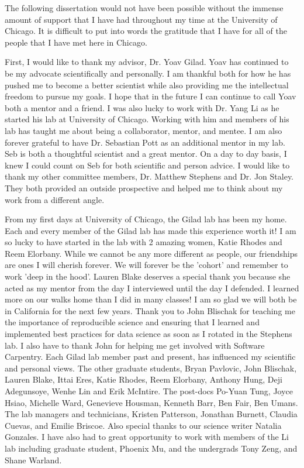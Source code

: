\acknowledgments

The following dissertation would not have been possible without the immense amount of support that I have had throughout my time at the University of Chicago. It is difficult to put into words the gratitude that I have for all of the people that I have met here in Chicago. 

First, I would like to thank my advisor, Dr. Yoav Gilad. Yoav has continued to be my advocate scientifically and personally. I am thankful both for how he has pushed me to become a better scientist while also providing me the intellectual freedom to pursue my goals. I hope that in the future I can continue to call Yoav both a mentor and a friend. I was also lucky to work with Dr. Yang Li as he started his lab at University of Chicago. Working with him and members of his lab has taught me about being a collaborator, mentor, and mentee. I am also forever grateful to have Dr. Sebastian Pott as an additional mentor in my lab. Seb is both a thoughtful scientist and a great mentor. On a day to day basis, I knew I could count on Seb for both scientific and person advice. I would like to thank my other committee members, Dr. Matthew Stephens and Dr. Jon Staley. They both provided an outside prospective and helped me to think about my work from a different angle. 

From my first days at University of Chicago, the Gilad lab has been my home. Each and every member of the Gilad lab has made this experience worth it! I am so lucky to have started in the lab with 2 amazing women, Katie Rhodes and Reem Elorbany. While we cannot be any more different as people, our friendships are ones I will cherish forever. We will forever be the 'cohort' and remember to work 'deep in the hood'. Lauren Blake deserves a special thank you because she acted as my mentor from the day I interviewed until the day I defended. I learned more on our walks home than I did in many classes! I am so glad we will both be in California for the next few years. Thank you to John Blischak for teaching me the importance of reproducible science and ensuring that I learned and implemented best practices for data science as soon as I rotated in the Stephens lab. I also have to thank John for helping me get involved with Software Carpentry.  Each Gilad lab member past and present, has influenced my scientific and personal views. The other graduate students, Bryan Pavlovic, John Blischak, Lauren Blake, Ittai Eres, Katie Rhodes, Reem Elorbany, Anthony Hung, Deji Adegunsoye, Wenhe Lin and Erik McIntire. The post-docs Po-Yuan Tung, Joyce Hsiao, Michelle Ward, Genevieve Housman, Kenneth Barr, Ben Fair, Ben Umans. The lab managers and technicians, Kristen Patterson, Jonathan Burnett, Claudia Cuevas, and Emilie Briscoe. Also special thanks to our science writer Natalia Gonzales. I have also had to great opportunity to work with members of the Li lab including graduate student, Phoenix Mu, and the undergrads Tony Zeng, and Shane Warland.

